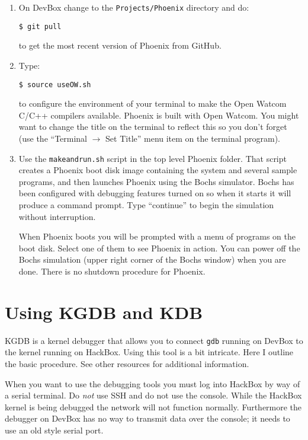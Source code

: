 \documentclass[twocolumn]{article}
\begin{document}
\begin{enumerate}

\item On DevBox change to the \texttt{Projects/Phoenix} directory and do:
\begin{Verbatim}
$ git pull
\end{Verbatim}
  to get the most recent version of Phoenix from GitHub.

\item Type:
\begin{Verbatim}
$ source useOW.sh
\end{Verbatim}
  to configure the environment of your terminal to make the Open Watcom C/C++ compilers
  available. Phoenix is built with Open Watcom. You might want to change the title on the
  terminal to reflect this so you don't forget (use the ``Terminal $\rightarrow$ Set Title''
  menu item on the terminal program).

\item Use the \texttt{makeandrun.sh} script in the top level Phoenix folder. That script creates
  a Phoenix boot disk image containing the system and several sample programs, and then launches
  Phoenix using the Bochs simulator. Bochs has been configured with debugging features turned on
  so when it starts it will produce a command prompt. Type ``continue'' to begin the simulation
  without interruption.

  When Phoenix boots you will be prompted with a menu of programs on the boot disk. Select one
  of them to see Phoenix in action. You can power off the Bochs simulation (upper right corner
  of the Bochs window) when you are done. There is no shutdown procedure for Phoenix.

\end{enumerate}

\section{Using KGDB and KDB}

KGDB is a kernel debugger that allows you to connect \texttt{gdb} running on DevBox to the
kernel running on HackBox. Using this tool is a bit intricate. Here I outline the basic
procedure. See other resources for additional information.

When you want to use the debugging tools you must log into HackBox by way of a serial terminal.
Do \emph{not} use SSH and do not use the console. While the HackBox kernel is being debugged the
network will not function normally. Furthermore the debugger on DevBox has no way to transmit
data over the console; it needs to use an old style serial port.
\end{document}

